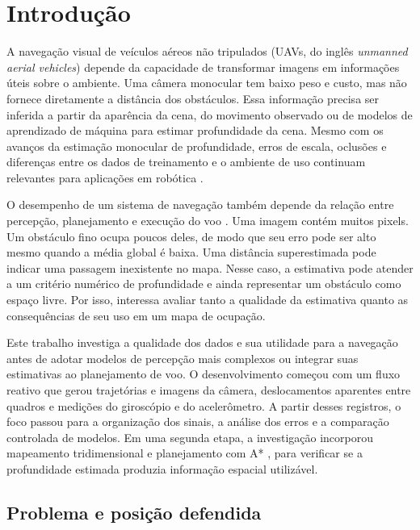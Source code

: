 \chapter{Introdução}\label{cap:introducao}



A navegação visual de veículos aéreos não tripulados (UAVs, do inglês \emph{unmanned aerial vehicles}) depende da capacidade de transformar imagens em informações úteis sobre o ambiente. Uma câmera monocular tem baixo peso e custo, mas não fornece diretamente a distância dos obstáculos. Essa informação precisa ser inferida a partir da aparência da cena, do movimento observado ou de modelos de aprendizado de máquina para estimar profundidade da cena. Mesmo com os avanços da estimação monocular de profundidade, erros de escala, oclusões e diferenças entre os dados de treinamento e o ambiente de uso continuam relevantes para aplicações em robótica \cite{Vyas2022,Arampatzakis2024,DepthAnythingV2}.

O desempenho de um sistema de navegação também depende da relação entre percepção, planejamento e execução do voo \cite{Loquercio2021}. Uma imagem contém muitos pixels. Um obstáculo fino ocupa poucos deles, de modo que seu erro pode ser alto mesmo quando a média global é baixa. Uma distância superestimada pode indicar uma passagem inexistente no mapa. Nesse caso, a estimativa pode atender a um critério numérico de profundidade e ainda representar um obstáculo como espaço livre. Por isso, interessa avaliar tanto a qualidade da estimativa quanto as consequências de seu uso em um mapa de ocupação.

Este trabalho investiga a qualidade dos dados e sua utilidade para a navegação antes de adotar modelos de percepção mais complexos ou integrar suas estimativas ao planejamento de voo. O desenvolvimento começou com um fluxo reativo que gerou trajetórias e imagens da câmera, deslocamentos aparentes entre quadros e medições do giroscópio e do acelerômetro. A partir desses registros, o foco passou para a organização dos sinais, a análise dos erros e a comparação controlada de modelos. Em uma segunda etapa, a investigação incorporou mapeamento tridimensional e planejamento com A* \cite{Hart1968}, para verificar se a profundidade estimada produzia informação espacial utilizável.

\section{Problema e posição defendida}

